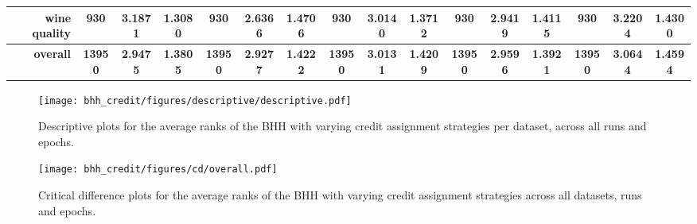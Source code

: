 \begin{table}[htbp]
{\begin{tabular}{rccccccccccccccc}
			wine quality                        & 930                                 & 3.1871                                                                    & 1.3080          & 930                                & \cellcolor[rgb]{ .776,  .937,  .808}\textcolor[rgb]{ 0,  .38,  0}{2.6366}          & 1.4706          & 930                                & 3.0140                                                                    & 1.3712          & 930                                & 2.9419                                                                    & 1.4115          & 930                                    & 3.2204                                                                    & 1.4300          \\
			\midrule
			\textbf{overall}                    & \textbf{13950}                      & \textbf{2.9475}                                                           & \textbf{1.3805} & \textbf{13950}                     & \cellcolor[rgb]{ .776,  .937,  .808}\textcolor[rgb]{ 0,  .38,  0}{\textbf{2.9277}} & \textbf{1.4222} & \textbf{13950}                     & \textbf{3.0131}                                                           & \textbf{1.4209} & \textbf{13950}                     & \textbf{2.9596}                                                           & \textbf{1.3921} & \textbf{13950}                         & \textbf{3.0644}                                                           & \textbf{1.4594} \\
		\end{tabular}%
	}
\end{table}%

\begin{figure}[htbp]
	\centering
	\texttt{[image: bhh\_credit/figures/descriptive/descriptive.pdf]}
	\caption{Descriptive plots for the average ranks of the \acs{BHH} with varying credit assignment strategies per dataset, across all runs and epochs.}
	\label{fig:results:credit:descriptive:descriptive}
\end{figure}

\begin{figure}[htbp]
	\centering
	\texttt{[image: bhh\_credit/figures/cd/overall.pdf]}
	\caption{Critical difference plots for the average ranks of the \acs{BHH} with varying credit assignment strategies across all datasets, runs and epochs.}
	\label{fig:results:credit:descriptive:cd}
\end{figure}

